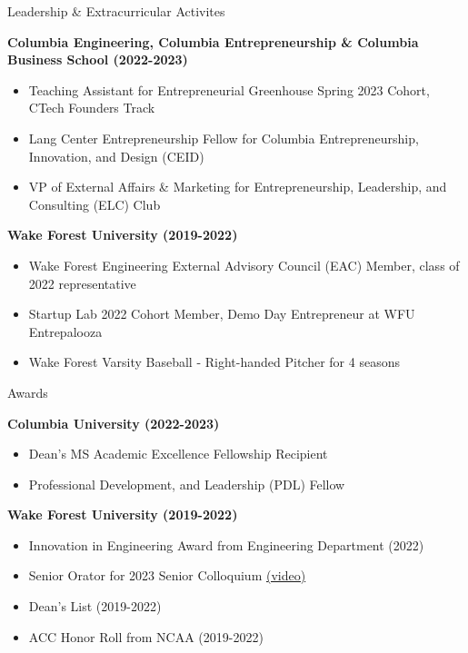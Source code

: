 \documentclass{resume} %
\begin{document}
\begin{rSection}{Leadership \& Extracurricular Activites} 

\textbf{Columbia Engineering, Columbia Entrepreneurship \& Columbia Business School (2022-2023)}
 \begin{itemize}
    \itemsep -2pt {}
     \item Teaching Assistant for Entrepreneurial Greenhouse Spring 2023 Cohort, CTech Founders Track
     \item Lang Center Entrepreneurship Fellow for Columbia Entrepreneurship, Innovation, and Design (CEID)
     \item VP of External Affairs \& Marketing for Entrepreneurship, Leadership, and Consulting (ELC) Club
 \end{itemize}

\textbf{Wake Forest University (2019-2022)}
 \begin{itemize}
    \itemsep -2pt {}
    \item Wake Forest Engineering External Advisory Council (EAC) Member, class of 2022 representative
    \item Startup Lab 2022 Cohort Member, Demo Day Entrepreneur at WFU Entrepalooza 
    \item Wake Forest Varsity Baseball - Right-handed Pitcher for 4 seasons
 \end{itemize}

\end{rSection}

\begin{rSection}{Awards} 

\textbf{Columbia University (2022-2023)}
 \begin{itemize}
    \itemsep -2pt {}
     \item Dean’s MS Academic Excellence Fellowship Recipient
     \item Professional Development, and Leadership (PDL) Fellow
 \end{itemize}

\textbf{Wake Forest University (2019-2022)}
 \begin{itemize}
    \itemsep -2pt {}
    \item Innovation in Engineering Award from Engineering Department (2022)
    \item Senior Orator for 2023 Senior Colloquium \href{https://foundersday.wfu.edu/senior-orations/}{(video)}
    \item Dean's List (2019-2022)
    \item ACC Honor Roll from NCAA (2019-2022)
 \end{itemize}

\end{rSection}
\end{document}
